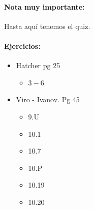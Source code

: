 \paragraph{Nota muy importante:} Hasta aquí tenemos el quiz.


\paragraph{Ejercicios:} 
\begin{itemize}
    \item Hatcher pg 25
    \begin{itemize}
        \item $3 - 6$
    \end{itemize}
    \item Viro - Ivanov. Pg 45
    \begin{itemize}
        \item 9.U 
        \item 10.1
        \item 10.7
        \item 10.P 
        \item 10.19
        \item 10.20
    \end{itemize}
\end{itemize}

